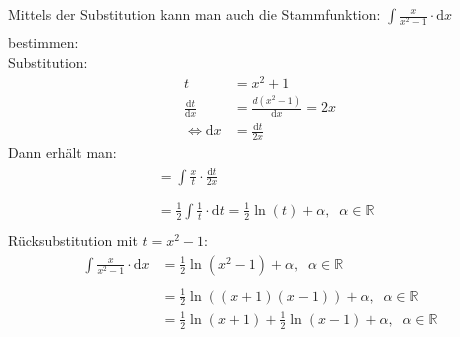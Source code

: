 Mittels der Substitution kann man auch die Stammfunktion: $ \int\limits_{}^{} \frac{x}{x^2-1}\cdot \mathrm{d}x $ bestimmen:\\
Substitution:\\
\begin{align*}
t&=x^2+1\\
\frac{\mathrm{d}t}{\mathrm{d}x}&=\frac{d(x^2-1)}{\mathrm{d}x}=2x\\
\Leftrightarrow \mathrm{d}x&=\frac{\mathrm{\mathrm{d}}t}{2x}
\end{align*}
Dann erhält man:\\
\begin{align*}
&=\int\limits_{}^{} \frac{x}{t}\cdot \frac{\mathrm{d}t}{2x}\\
&=\frac{1}{2}\int\limits_{}^{} \frac{1}{t}\cdot \mathrm{d}t=\frac{1}{2}\ln(t)+\alpha,\;\;\alpha\in\mathbb{R}
\end{align*}
Rücksubstitution mit $ t=x^2-1 $:\\
\begin{align*}
\int\limits_{}^{} \frac{x}{x^2-1}\cdot \mathrm{d}x&=\frac{1}{2}\ln(x^2-1)+\alpha,\;\;\alpha\in\mathbb{R}\\
&=\frac{1}{2}\ln((x+1)(x-1))+\alpha,\;\;\alpha\in\mathbb{R}\\
&=\frac{1}{2}\ln(x+1)+\frac{1}{2}\ln(x-1)+\alpha,\;\;\alpha\in\mathbb{R}\\
\end{align*}
